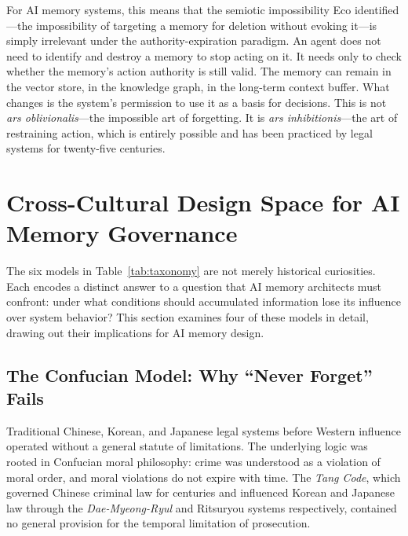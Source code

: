 \documentclass[12pt]{article}
\begin{document}
For AI memory systems, this means that the semiotic impossibility Eco identified---the impossibility of targeting a memory for deletion without evoking it---is simply irrelevant under the authority-expiration paradigm. An agent does not need to identify and destroy a memory to stop acting on it. It needs only to check whether the memory's action authority is still valid. The memory can remain in the vector store, in the knowledge graph, in the long-term context buffer. What changes is the system's permission to use it as a basis for decisions. This is not \emph{ars oblivionalis}---the impossible art of forgetting. It is \emph{ars inhibitionis}---the art of restraining action, which is entirely possible and has been practiced by legal systems for twenty-five centuries.

\section{Cross-Cultural Design Space for AI Memory Governance}
\label{sec:design-space}

The six models in Table~\ref{tab:taxonomy} are not merely historical curiosities. Each encodes a distinct answer to a question that AI memory architects must confront: under what conditions should accumulated information lose its influence over system behavior? This section examines four of these models in detail, drawing out their implications for AI memory design.

\subsection{The Confucian Model: Why ``Never Forget'' Fails}
\label{sec:confucian}

Traditional Chinese, Korean, and Japanese legal systems before Western influence operated without a general statute of limitations. The underlying logic was rooted in Confucian moral philosophy: crime was understood as a violation of moral order, and moral violations do not expire with time. The \emph{Tang Code}, which governed Chinese criminal law for centuries and influenced Korean and Japanese law through the \emph{Dae-Myeong-Ryul} and Ritsuryou systems respectively, contained no general provision for the temporal limitation of prosecution.
\end{document}
